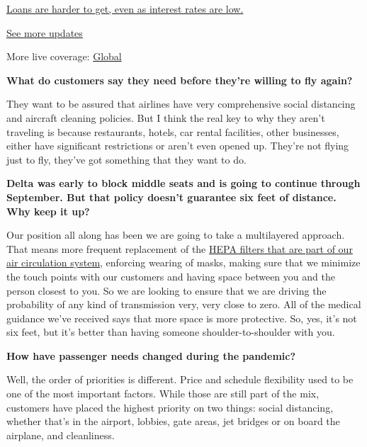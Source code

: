 \href{https://www.nytimes.com/live/2020/08/04/business/stock-market-today-coronavirus?action=click\&pgtype=Article\&state=default\&region=MAIN_CONTENT_1\&context=storylines_live_updates\#loans-are-harder-to-get-even-as-interest-rates-are-low}{Loans
are harder to get, even as interest rates are low.}

\href{https://www.nytimes.com/live/2020/08/04/business/stock-market-today-coronavirus?action=click\&pgtype=Article\&state=default\&region=MAIN_CONTENT_1\&context=storylines_live_updates}{See
more updates}

More live coverage:
\href{https://www.nytimes.com/2020/08/04/world/coronavirus-cases.html?action=click\&pgtype=Article\&state=default\&region=MAIN_CONTENT_1\&context=storylines_live_updates}{Global}

\textbf{What do customers say they need before they're willing to fly
again?}

They want to be assured that airlines have very comprehensive social
distancing and aircraft cleaning policies. But I think the real key to
why they aren't traveling is because restaurants, hotels, car rental
facilities, other businesses, either have significant restrictions or
aren't even opened up. They're not flying just to fly, they've got
something that they want to do.

\textbf{Delta was early to block middle seats and is going to continue
through September. But that policy doesn't guarantee six feet of
distance. Why keep it up?}

Our position all along has been we are going to take a multilayered
approach. That means more frequent replacement of the
\href{https://www.nytimes.com/2020/04/30/business/airlines-masks-coronavirus-passengers.html}{HEPA
filters that are part of our air circulation system}, enforcing wearing
of masks, making sure that we minimize the touch points with our
customers and having space between you and the person closest to you. So
we are looking to ensure that we are driving the probability of any kind
of transmission very, very close to zero. All of the medical guidance
we've received says that more space is more protective. So, yes, it's
not six feet, but it's better than having someone shoulder-to-shoulder
with you.

\textbf{How have passenger needs changed during the pandemic?}

Well, the order of priorities is different. Price and schedule
flexibility used to be one of the most important factors. While those
are still part of the mix, customers have placed the highest priority on
two things: social distancing, whether that's in the airport, lobbies,
gate areas, jet bridges or on board the airplane, and cleanliness.

